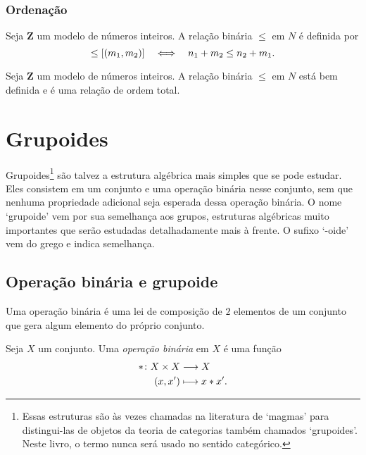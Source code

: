 \subsubsection{Ordenação}

\begin{definition}
	Seja $\bm Z$ um modelo de números inteiros. A relação binária $\leq$ em $N$ é definida por
	\begin{equation*}
	[(n_1,n_2)] \leq [(m_1,m_2)] \sse n_1+m_2 \leq n_2+m_1.
	\end{equation*}
\end{definition}

\begin{exercise}
	Seja $\bm Z$ um modelo de números inteiros. A relação binária $\leq$ em $N$ está bem definida e é uma relação de ordem total.
\end{exercise}

\section{Grupoides}

Grupoides\footnote{Essas estruturas são às vezes chamadas na literatura de `magmas' para distingui-las de objetos da teoria de categorias também chamados `grupoides'. Neste livro, o termo nunca será usado no sentido categórico.} são talvez a estrutura algébrica mais simples que se pode estudar. Eles consistem em um conjunto e uma operação binária nesse conjunto, sem que nenhuma propriedade adicional seja esperada dessa operação binária. O nome `grupoide' vem por sua semelhança aos grupos, estruturas algébricas muito importantes que serão estudadas detalhadamente mais à frente. O sufixo `-oide' vem do grego e indica semelhança.

\subsection{Operação binária e grupoide}

Uma operação binária é uma lei de composição de $2$ elementos de um conjunto que gera algum elemento do próprio conjunto.

\begin{definition}
Seja $X$ um conjunto. Uma \emph{operação binária} em $X$ é uma função
	\begin{align*}
	{\ast}\colon {X \times X} &\longrightarrow {X} \\{(x,x')} &\longmapsto x \ast x'.
	\end{align*}
\end{definition}

